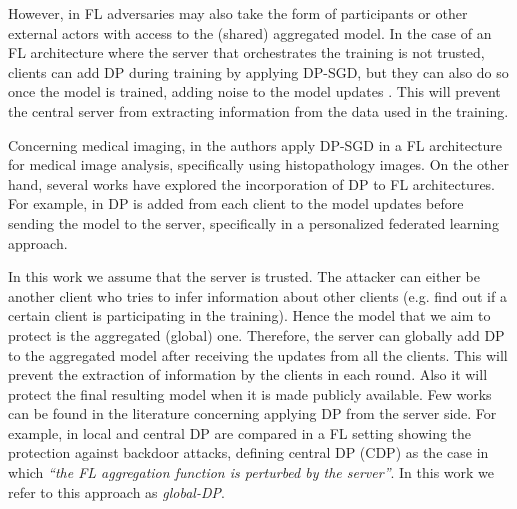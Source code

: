 However, in FL adversaries may also take the form of participants or other external actors with access to the (shared) aggregated model. In the case of an FL architecture where the server that orchestrates the training is not trusted, clients can add DP during training by applying DP-SGD, but they can also do so once the model is trained, adding noise to the model updates \cite{10386466}. This will prevent the central server from extracting information from the data used in the training. 

Concerning medical imaging, in \cite{adnan2022federated} the authors apply DP-SGD in a FL architecture for medical image analysis, specifically using histopathology images. On the other hand, several works have explored the incorporation of DP to FL architectures. For example, in \cite{9082603} DP is added from each client to the model updates before sending the model to the server, specifically in a personalized federated learning approach.

In this work we assume that the server is trusted. The attacker can either be another client who tries to infer information about other clients (e.g. find out if a certain client is participating in the training). Hence the model that we aim to protect is the aggregated (global) one. Therefore, the server can globally add DP to the aggregated model after receiving the updates from all the clients. This will prevent the extraction of information by the clients in each round. Also it will protect the final resulting model when it is made publicly available.
Few works can be found in the literature concerning applying DP from the server side. For example, in \cite{naseri2020local} local and central DP are compared in a FL setting showing the protection against backdoor attacks, defining central DP (CDP) as the case in which \textit{``the FL aggregation function is perturbed by the server''}. In this work we refer to this approach as \emph{global-DP}.